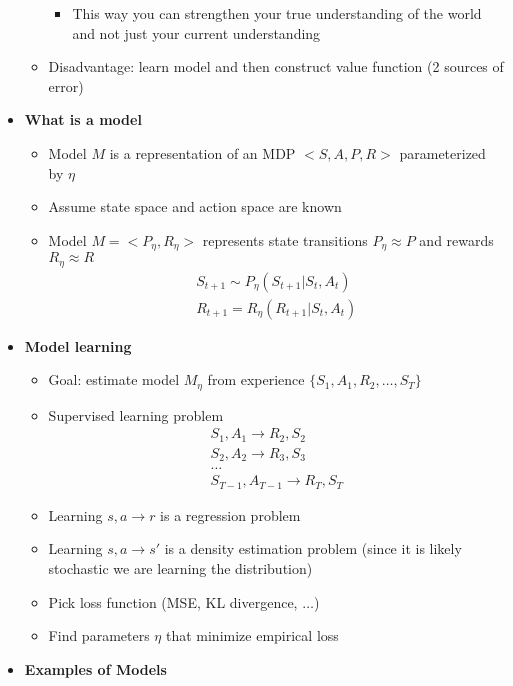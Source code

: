 \documentclass[12pt]{article}
\begin{document}
\begin{itemize}
\begin{itemize}
\begin{itemize}
        \item This way you can strengthen your true understanding of the world and
        not just your current understanding
      \end{itemize}
      \item Disadvantage: learn model and then construct value function (2 sources of error)
    \end{itemize}
    \item \textbf{What is a model}
    \begin{itemize}
      \item Model $M$ is a representation of an MDP $<S, A, P, R>$ parameterized by $\eta$
      \item Assume state space and action space are known
      \item Model $M = <P_\eta, R_\eta>$ represents state transitions
      $P_\eta \approx P$ and rewards $R_\eta \approx R$
      \begin{gather*}
        S_{t+1} \sim P_\eta(S_{t+1} | S_t, A_t) \\
        R_{t+1} = R_\eta(R_{t+1} | S_t, A_t)
      \end{gather*}
    \end{itemize}
    \item \textbf{Model learning}
    \begin{itemize}
      \item Goal: estimate model $M_\eta$ from experience $\{S_1, A_1, R_2, \dots, S_T\}$
      \item Supervised learning problem
      \begin{gather*}
        S_1, A_1 \rightarrow R_2, S_2 \\
        S_2, A_2 \rightarrow R_3, S_3 \\
        \dots \\
        S_{T-1}, A_{T-1} \rightarrow R_T, S_T
      \end{gather*}
      \item Learning $s, a \rightarrow r$ is a regression problem
      \item Learning $s, a \rightarrow s'$ is a density estimation problem (since it is likely stochastic we are
      learning the distribution)
      \item Pick loss function (MSE, KL divergence, $\dots$)
      \item Find parameters $\eta$ that minimize empirical loss
    \end{itemize}
    \item \textbf{Examples of Models}

\end{itemize}
\end{document}

